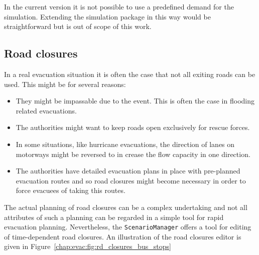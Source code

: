 In the current version it is not possible to use a predefined demand for the simulation. Extending the simulation package in this way would be straightforward but is out of scope of this work.


\subsection{Road closures}
In a real evacuation situation it is often the case that not all exiting roads can be used. This might be for several reasons:
\begin{itemize}
\item They might be impassable due to the event. This is often the case in flooding related evacuations.
\item The authorities might want to keep roads open exclusively for rescue forces.
\item In some situations, like hurricane evacuations, the direction of lanes on motorways might be reversed to in crease the flow capacity in one direction.
\item The authorities have detailed evacuation plans in place with pre-planned evacuation routes and so road closures might become necessary in order to force evacuees of taking this routes.
\end{itemize}
The actual planning of road closures can be a complex undertaking and not all attributes of such a planning can be regarded in a simple tool for rapid evacuation planning. Nevertheless, the  \verb+ScenarioManager+ offers a tool for editing of time-dependent road closures. An illustration of the road closures editor is given in Figure~\ref{chap:evac:fig:rd_closures_bus_stops}
